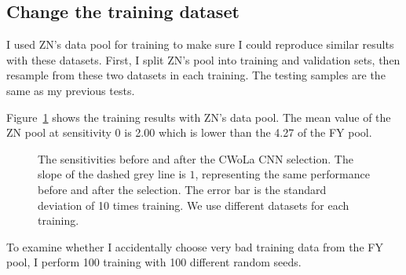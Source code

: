 \documentclass[12pt]{article}
\begin{document}
	\subsection{Change the training dataset}%
	\label{sub:change_the_training_dataset}
		I used ZN's data pool for training to make sure I could reproduce similar results with these datasets. First, I split ZN's pool into training and validation sets, then resample from these two datasets in each training. The testing samples are the same as my previous tests.

		Figure~\ref{fig:sensitivity_improvement_ZN_pool} shows the training results with ZN's data pool. The mean value of the ZN pool at sensitivity 0 is 2.00 which is lower than the 4.27 of the FY pool.
        \begin{figure}[htpb]
            \centering
            \caption{The sensitivities before and after the CWoLa CNN selection. The slope of the dashed grey line is $1$, representing the same performance before and after the selection. The error bar is the standard deviation of 10 times training. We use different datasets for each training.}
            \label{fig:sensitivity_improvement_ZN_pool}
        \end{figure}

		To examine whether I accidentally choose very bad training data from the FY pool, I perform 100 training with 100 different random seeds.
\end{document}
